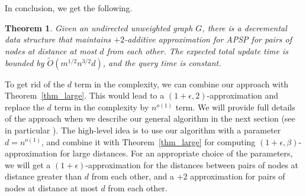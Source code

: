 \documentclass[11pt]{article}
\newtheorem{theorem}{Theorem}[section]
\theoremstyle{definition}
\theoremstyle{remark}
\newcommand{\ttodo}[1]{\todo[color=orange!20]{T: #1}}
\begin{document}
\begin{titlepage}
In conclusion, we get the following.

\begin{theorem}
Given an undirected unweighted graph $G$, there is a decremental data structure that maintains $+2$-additive approximation for APSP for pairs of nodes at distance at most $d$ from each other. The expected total update time is bounded by $\tilde{O}(m^{1/2}n^{3/2}d)$, and the query time is constant.
\end{theorem}%

To get rid of the $d$ term in the complexity, we can combine our approach with Theorem~\ref{thm_large}. This would lead to a $(1+\epsilon,2)$-approximation and replace the $d$ term in the complexity by $n^{o(1)}$ term. We will provide full details of the approach when we describe our general algorithm in the next section (see in particular ). The high-level idea is to use our algorithm with a parameter $d=n^{o(1)}$, and combine it with Theorem~\ref{thm_large} for computing $(1+\epsilon,\beta)$-approximation for large distances. For an appropriate choice of the parameters, we will get a $(1+\epsilon)$-approximation for the distances between pairs of nodes at distance greater than $d$ from each other, and a $+2$ approximation for pairs of nodes at distance at most $d$ from each other. 


\end{titlepage}
\end{document}
